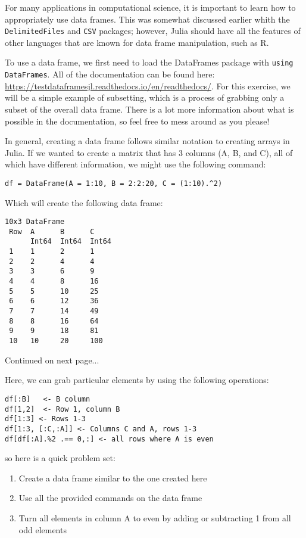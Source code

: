 \documentclass[11pt]{article}
\begin{document}
For many applications in computational science, it is important to learn how to appropriately use data frames. This was somewhat discussed earlier whith the \texttt{DelimitedFiles} and \texttt{CSV} packages; however, Julia should have all the features of other languages that are known for data frame manipulation, such as R.

To use a data frame, we first need to load the DataFrames package with \texttt{using DataFrames}. All of the documentation can be found here: \url{https://testdataframesjl.readthedocs.io/en/readthedocs/}. For this exercise, we will be a simple example of subsetting, which is a process of grabbing only a subset of the overall data frame. There is a lot more information about what is possible in the documentation, so feel free to mess around as you please!

In general, creating a data frame follows similar notation to creating arrays in Julia. If we wanted to create a matrix that has 3 columns (A, B, and C), all of which have different information, we might use the following command:

\begin{lstlisting}
df = DataFrame(A = 1:10, B = 2:2:20, C = (1:10).^2)
\end{lstlisting}

Which will create the following data frame:

\begin{lstlisting}
10x3 DataFrame
 Row  A      B      C     
      Int64  Int64  Int64 
 1    1      2      1     
 2    2      4      4     
 3    3      6      9     
 4    4      8      16    
 5    5      10     25    
 6    6      12     36    
 7    7      14     49    
 8    8      16     64    
 9    9      18     81    
 10   10     20     100   

\end{lstlisting}
Continued on next page...

\newpage
Here, we can grab particular elements by using the following operations:

\begin{lstlisting}
df[:B]   <- B column
df[1,2]  <- Row 1, column B
df[1:3] <- Rows 1-3
df[1:3, [:C,:A]] <- Columns C and A, rows 1-3
df[df[:A].%2 .== 0,:] <- all rows where A is even
\end{lstlisting}

so here is a quick problem set:

\begin{enumerate}
\item Create a data frame similar to the one created here
\item Use all the provided commands on the data frame
\item Turn all elements in column A to even by adding or subtracting 1 from all odd elements
\end{enumerate}
\end{document}
